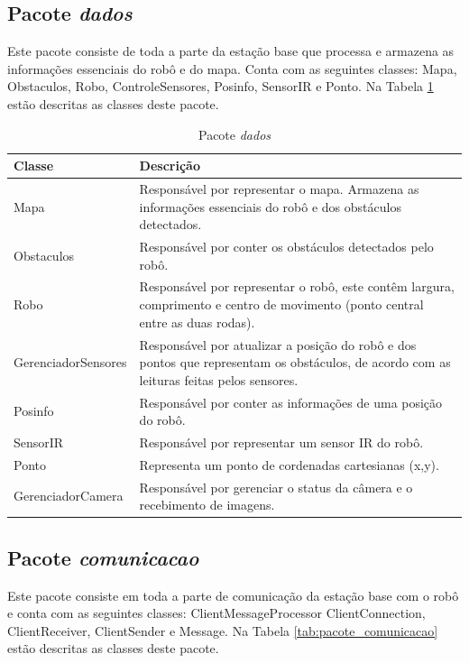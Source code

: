 \subsection{Pacote \textit{dados}}

Este pacote consiste de toda a parte da estação base que processa e armazena as informações essenciais do robô e do mapa. Conta com as seguintes classes: Mapa, Obstaculos, Robo, ControleSensores, Posinfo, SensorIR e Ponto. Na Tabela \ref{tab:pacote_controle} estão descritas as classes deste pacote.

\begin{table}[h]
  \centering
  \caption{Pacote \textit{dados}}
  \begin{tabular}{p{6cm}p{8cm}}
    \toprule
    \textbf{Classe} & \textbf{Descrição} \\ 
    \midrule
    Mapa  & Responsável por representar o mapa. Armazena as informações essenciais do robô e dos obstáculos detectados. \\ \hline
    Obstaculos & Responsável por conter os obstáculos detectados pelo robô. \\ \hline
    Robo  & Responsável por representar o robô, este contêm largura, comprimento e centro de movimento (ponto central entre as duas rodas). \\ \hline
    GerenciadorSensores & Responsável por atualizar a posição do robô e dos pontos que representam os obstáculos, de acordo com as leituras feitas pelos sensores. \\ \hline
    Posinfo & Responsável por conter as informações de uma posição do robô. \\ \hline
    SensorIR & Responsável por representar um sensor IR do robô. \\ \hline 
    Ponto & Representa um ponto de cordenadas cartesianas (x,y). \\ \hline
    GerenciadorCamera & Responsável por gerenciar o status da câmera e o recebimento de imagens. \\ 
    \bottomrule
  \end{tabular}%
  \label{tab:pacote_controle}%
\end{table}%

\subsection{Pacote \textit{comunicacao}}
\label{subsec:pacote_comunicacao}

Este pacote consiste em toda a parte de comunicação da estação base com o robô e conta com as seguintes classes: ClientMessageProcessor ClientConnection, ClientReceiver, ClientSender e Message. Na Tabela \ref{tab:pacote_comunicacao} estão descritas as classes deste pacote.

